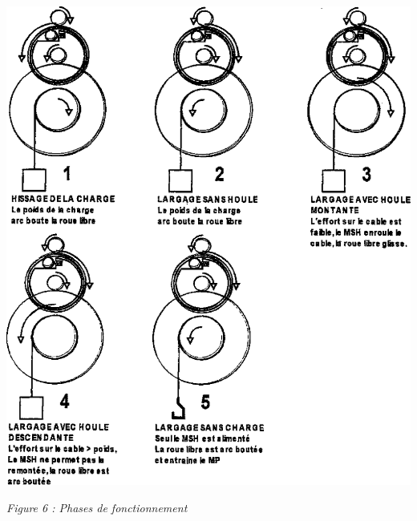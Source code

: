 \documentclass[10pt,fleqn]{article} %
\begin{document}
\begin{minipage}[c]{.49\linewidth}
\begin{center}
\includegraphics[width=\textwidth]{images/Treuil_02}

\textit{Figure 6 : Phases de fonctionnement}
\end{center}
\end{minipage} 



\end{document}
